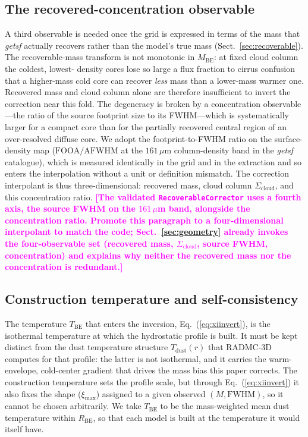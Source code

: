 \documentclass[11pt,a4paper]{article}
\newcommand{\note}[1]{\textcolor{magenta}{\textbf{[#1]}}}
\newcommand{\Rbe}{R_{\mathrm{BE}}}
\newcommand{\Tbe}{T_{\mathrm{BE}}}
\newcommand{\ximax}{\xi_{\mathrm{max}}}
\newcommand{\Scloud}{\Sigma_{\mathrm{cloud}}}
\begin{document}
\subsection{The recovered-concentration observable}
\label{sec:concentration}

A third observable is needed once the grid is expressed in terms of the mass
that \emph{getsf} actually recovers rather than the model's true mass
(Sect.~\ref{sec:recoverable}). The recoverable-mass transform is not
monotonic in $M_{\mathrm{BE}}$: at fixed cloud column the coldest, lowest-
density cores lose so large a flux fraction to cirrus confusion that a
higher-mass cold core can recover \emph{less} mass than a lower-mass warmer
one. Recovered mass and cloud column alone are therefore insufficient to
invert the correction near this fold. The degeneracy is broken by a
concentration observable---the ratio of the source footprint size to its
FWHM---which is systematically larger for a compact core than for the
partially recovered central region of an over-resolved diffuse core. We adopt
the footprint-to-FWHM ratio on the surface-density map ($\mathrm{FOOA}/
\mathrm{AFWHM}$ at the $161\,\mu$m column-density band in the \emph{getsf}
catalogue), which is measured identically in the grid and in the extraction
and so enters the interpolation without a unit or definition mismatch. The
correction interpolant is thus three-dimensional: recovered mass, cloud
column $\Scloud$, and this concentration ratio.
\note{The validated \texttt{RecoverableCorrector} uses a fourth axis, the
source FWHM on the $161\,\mu$m band, alongside the concentration ratio.
Promote this paragraph to a four-dimensional interpolant to match the code;
Sect.~\ref{sec:geometry} already invokes the four-observable set (recovered
mass, $\Scloud$, source FWHM, concentration) and explains why neither the
recovered mass nor the concentration is redundant.}

\subsection{Construction temperature and self-consistency}
\label{sec:tbe}

The temperature $\Tbe$ that enters the inversion, Eq.~(\ref{eq:xiinvert}), is the
isothermal temperature at which the hydrostatic profile is built. It must be kept
distinct from the dust temperature structure $T_{\mathrm{dust}}(r)$ that RADMC-3D
computes for that profile: the latter is not isothermal, and it carries the
warm-envelope, cold-center gradient that drives the mass bias this paper corrects.
The construction temperature sets the profile scale, but through
Eq.~(\ref{eq:xiinvert}) it also fixes the shape ($\ximax$) assigned to a given
observed $(M,\mathrm{FWHM})$, so it cannot be chosen arbitrarily. We take $\Tbe$
to be the mass-weighted mean dust temperature within $\Rbe$, so that each model is
built at the temperature it would itself have.
\end{document}
